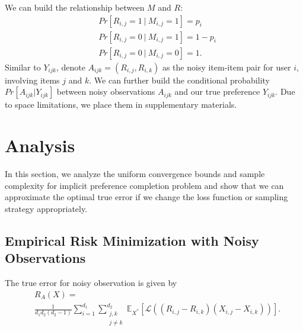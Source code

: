 \documentclass{article}
\numberwithin{equation}{section}
\newtheorem{sampling strategy}{Sampling Strategy}
\begin{document}
We can build the relationship between $M$ and $R$:
\begin{equation}
\begin{aligned}
    & Pr[R_{i,j} = 1 ~|~ M_{i,j} = 1] = p_i\\
    & Pr[R_{i,j} = 0 ~|~ M_{i,j} = 1] = 1 - p_i\\
    & Pr[R_{i,j} = 0 ~|~ M_{i,j} = 0] = 1. \nonumber
\end{aligned}
\end{equation}
Similar to $Y_{ijk}$, denote $A_{ijk} = (R_{i,j}, R_{i,k})$ as the noisy item-item pair for user $i$, involving items $j$ and $k$. We can further build the conditional probability $Pr[A_{ijk} | Y_{ijk}] $ between noisy observations $A_{ijk}$ and our true preference $Y_{ijk}$. Due to  space limitations, we place them in supplementary materials.






\section{Analysis}
\label{sec:analysis}

In this section, we analyze the uniform convergence bounds and sample complexity for implicit preference completion problem and show that we can approximate the optimal true error if we change the loss function or sampling strategy appropriately.

\subsection{Empirical Risk Minimization with Noisy Observations}

The true error for noisy observation is given by
\begin{equation}
    \begin{aligned}
    & R_A(X) = \\
    & \frac{1}{d_1 d_2(d_2-1)} \sum_{i=1}^{d_1}\sum_{\substack{j,k\\ j \neq k} }^{d_2} \mathbb{E}_{X^*} [ \mathcal{L}( (R_{i,j} - R_{i,k})(X_{i,j} - X_{i,k}) ) ].   \nonumber
    \end{aligned}
\end{equation} 
\end{document}
